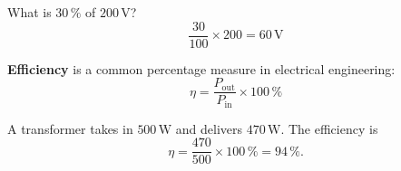 \begin{exempel}
What is $30\,\%$ of $200\,\text{V}$?
\[
  \frac{30}{100} \times 200 = 60\,\text{V}
\]
\end{exempel}

\textbf{Efficiency} is a common percentage measure in electrical engineering:
\[
  \eta = \frac{P_{\text{out}}}{P_{\text{in}}} \times 100\,\%
\]

\begin{exempel}
A transformer takes in $500\,\text{W}$ and delivers $470\,\text{W}$. The efficiency is
\[
  \eta = \frac{470}{500} \times 100\,\% = 94\,\%.
\]
\end{exempel}
